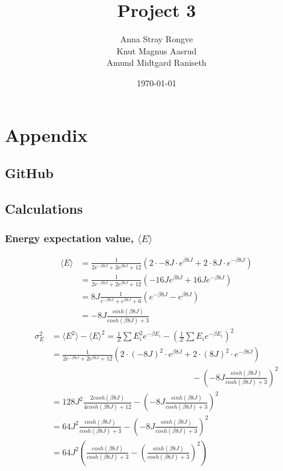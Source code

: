 \documentclass{article}
\title{Project 3}
\author{Anna Stray Rongve \\ Knut Magnus Aasrud \\ Amund Midtgard Raniseth}
\date{\today}
\begin{document}
\maketitle




 








\section{Appendix}
\subsection{GitHub}

\subsection{Calculations}
\subsubsection*{Energy expectation value, $\langle E \rangle$}
\begin{align}\label{eq:mean_energy}
    \langle E \rangle &= \frac{1}{2e^{-\beta 8J} + 2e^{\beta 8J} + 12} \left(2 \cdot -8J \cdot e^{\beta 8J} + 2\cdot 8J \cdot e^{-\beta8J}\right)\nonumber \\
    &= \frac{1}{2e^{-\beta 8J} + 2e^{\beta 8J} + 12} \left(-16J e^{\beta8J} + 16Je^{-\beta 8J}\right)\nonumber \\
    &= 8J \frac{1}{e^{-\beta 8J} + e^{\beta 8J} + 6}  \left(e^{-\beta8J} - e^{\beta 8J}\right)\nonumber \\
    &= -8J\frac{sinh(\beta 8 J)}{cosh(\beta 8 J) + 3}
\end{align}
\begin{align}\label{eq:mean_energy_var}
    \sigma^2_E &= \langle E^2 \rangle - \langle E \rangle ^2 = \frac{1}{Z}\sum E_i^2 e^{-\beta E_i} - \left( \frac{1}{Z} \sum E_i e^{-\beta E_i} \right)^2\nonumber \\
    &= \frac{1}{2e^{-\beta 8J} + 2e^{\beta 8J} + 12} \left( 2 \cdot (-8J)^2 \cdot e^{\beta 8J} + 2 \cdot (8J)^2 \cdot e^{-\beta 8J} \right)\nonumber \\
    &\hspace{7cm} - \left(-8J\frac{sinh(\beta 8 J)}{cosh(\beta 8 J) + 3}\right)^2\nonumber \\
    &=128J^2\frac{2cosh(\beta 8J)}{4cosh(\beta 8 J) + 12} - \left(-8J\frac{sinh(\beta 8 J)}{cosh(\beta 8 J) + 3}\right)^2\nonumber \\
    &=64J^2\frac{cosh(\beta 8J)}{cosh(\beta 8 J) + 3} - \left(-8J\frac{sinh(\beta 8 J)}{cosh(\beta 8 J) + 3}\right)^2\nonumber \\
    &= 64J^2\left(\frac{cosh(\beta 8J)}{cosh(\beta 8 J) + 3} - \left(\frac{sinh(\beta 8 J)}{cosh(\beta 8 J) + 3}\right)^2\right)
\end{align}
\end{document}
